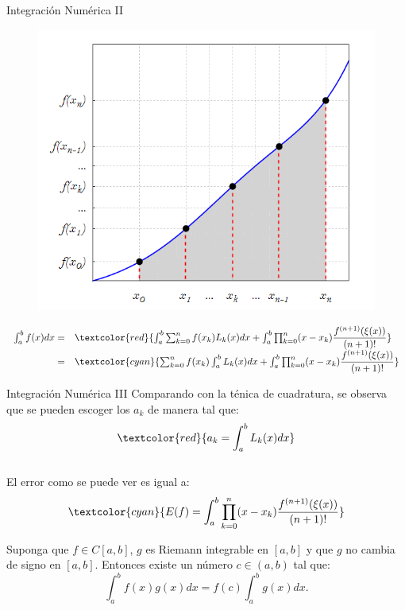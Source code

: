 \begin{frame}{Integración Numérica II}
\begin{figure}[H]
\centering
\includegraphics[scale=0.6]{Imagen62}
\end{figure}
\begin{displaymath}
\begin{array}{rl}
\int_a^b f(x)dx=&\textcolor{red}{\int_a^b\sum_{k=0}^n f(x_k)L_k(x)dx+\int_a^b\prod_{k=0}^{n}(x-x_k)\dfrac{f^{(n+1)}(\xi(x))}{(n+1)!}}\\
=&\textcolor{cyan}{\sum_{k=0}^n f(x_k)\int_a^b L_k(x)dx+\int_a^b\prod_{k=0}^{n}(x-x_k)\dfrac{f^{(n+1)}(\xi(x))}{(n+1)!}}
\end{array}
\end{displaymath}
\end{frame}
\begin{frame}{Integración Numérica III}
\indent Comparando con la ténica de cuadratura, se observa que se pueden escoger los $a_k$ de manera tal que: 
$$\textcolor{red}{a_k=\int_a^b L_k(x)dx}$$\\
El error como se puede ver es igual a:
$$\textcolor{cyan}{E(f)=\int_a^b\prod_{k=0}^{n}(x-x_k)\dfrac{f^{(n+1)}(\xi(x))}{(n+1)!}}$$
\begin{Teo}
Suponga que $f\in C[a,b]$, $g$ es Riemann integrable en $[a,b]$ y que $g$ no cambia de signo en $[a,b]$. Entonces existe un número $c\in (a,b)$ tal que:
$$\int_{a}^{b}f(x)g(x)dx=f(c)\int_a^bg(x)dx.$$
\end{Teo}
\end{frame}
